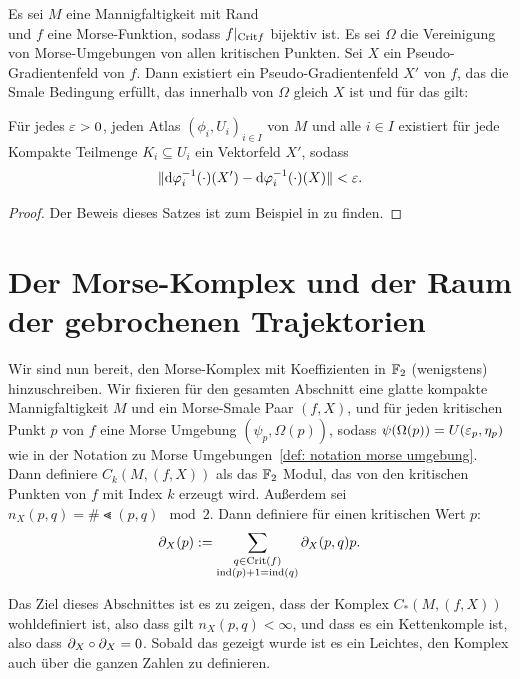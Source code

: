 \begin{theorem}
    Es sei $M$ eine Mannigfaltigkeit mit Rand  \\
    und $f$ eine Morse-Funktion, sodass $f|_{{ \operatorname{Crit} }{f}}$ bijektiv ist. Es sei $\Omega$ die Vereinigung 
    von Morse-Umgebungen von allen kritischen Punkten. Sei $X$ ein Pseudo-Gradientenfeld von $f$. 
    Dann existiert ein Pseudo-Gradientenfeld $X'$ von $f$, das die Smale Bedingung erfüllt, das 
    innerhalb von $\Omega$ gleich $X$ ist und für das gilt:

    Für jedes $\varepsilon > 0$, jeden Atlas $(\phi_i, U_i)_{i \in I}$ von $M$ und alle $i \in I$ existiert 
    für jede Kompakte Teilmenge $K_i \subseteq U_i$ ein Vektorfeld $X'$, sodass 
    \[ \| { \operatorname{d} } \varphi_i^{-1} (\cdot) (X') - { \operatorname{d} } \varphi_i^{-1} (\cdot) (X) \| < \varepsilon . \]
\end{theorem}

\begin{proof}
     Der Beweis dieses Satzes ist zum Beispiel in \cite{audin} zu finden.
\end{proof}

\section{Der Morse-Komplex und der Raum der gebrochenen Trajektorien}

Wir sind nun bereit, den Morse-Komplex mit Koeffizienten in ${ \mathbb F }_2$ (wenigstens) hinzuschreiben.
Wir fixieren für den gesamten Abschnitt eine glatte kompakte Mannigfaltigkeit $M$ und ein
Morse-Smale Paar $(f, X)$, und für jeden kritischen Punkt $p$ von $f$ eine Morse Umgebung 
$(\psi_p, \Omega(p))$, sodass $\psi(\Omega(p)) = U(\varepsilon_p, \eta_p)$ wie in der Notation zu Morse 
Umgebungen~\ref{def: notation morse umgebung}. Dann definiere $C_k (M, (f, X))$ als das ${ \mathbb F }_2$ Modul, 
das von den kritischen Punkten von $f$ mit Index $k$ erzeugt wird. Außerdem sei 
$n_X(p, q) = \# \Lt (p, q) \mod 2$. Dann definiere für einen kritischen Wert $p$:
\[ { \partial }_X (p) := \sum_{\substack{ q \in { \operatorname{Crit} }(f) \\ { \operatorname{ind} } (p) + 1 = { \operatorname{ind} } (q) }} { \partial }_X(p, q)p . \]

Das Ziel dieses Abschnittes ist es zu zeigen, dass der Komplex $C_{\ast}(M, (f, X))$ wohldefiniert
ist, also dass gilt $n_X (p, q) < \infty$, und dass es ein Kettenkomple ist, also dass 
${ \partial }_X \circ { \partial }_X = 0$. Sobald das gezeigt wurde ist es ein Leichtes, den Komplex auch über die 
ganzen Zahlen zu definieren.

